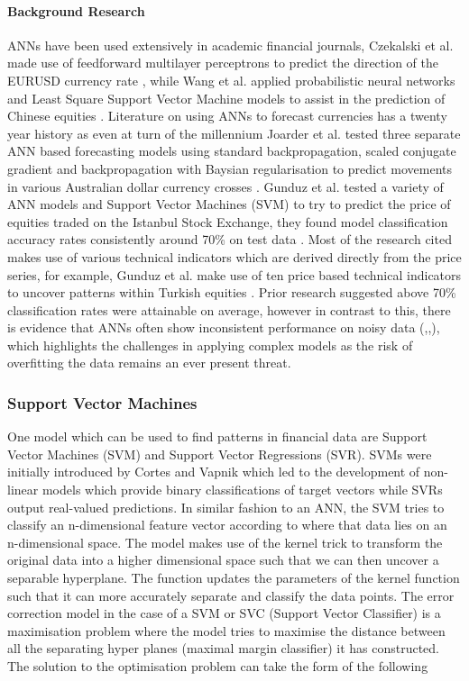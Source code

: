 \documentclass[11pt]{article}
\begin{document}
\paragraph{Background Research}
ANNs have been used extensively in academic financial journals, Czekalski et al. made use of feedforward multilayer perceptrons to predict the direction of the EURUSD currency rate \cite{Czekalski2015}, while Wang et al. applied probabilistic neural networks and  Least Square Support Vector Machine models to assist in the prediction of Chinese equities \cite{Wang2014} . Literature on using ANNs to forecast currencies has a twenty year history as even at turn of the millennium Joarder et al.  tested three separate ANN based forecasting models using standard backpropagation, scaled conjugate gradient and backpropagation with Baysian regularisation to predict movements in various Australian dollar currency crosses \cite{Joarder2003}. Gunduz et al. tested a variety of ANN models and Support Vector Machines (SVM) to try to predict the price of equities traded on the Istanbul Stock Exchange, they found model classification accuracy rates consistently around 70\% on test data \cite{Gunduz2017} . \newline Most of the research cited makes use of various technical indicators which are derived directly from the price series, for example, Gunduz et al. make use of ten price based technical indicators to uncover patterns within Turkish equities \cite{Gunduz2017}. Prior research suggested above 70\% classification rates were attainable on average, however in contrast to this, there is evidence that ANNs often show inconsistent performance on noisy data (\cite{Kim2003},\cite{Kumar2006},\cite{Kim2000}), which highlights the challenges in applying complex models as the risk of overfitting the data remains an ever present threat. 

\subsubsection{Support Vector Machines}
One model which can be used to find patterns in financial data are Support Vector Machines (SVM) and Support Vector Regressions (SVR). SVMs were initially introduced by Cortes and Vapnik \cite{Cortes1995} which led to the development of non-linear models which provide binary classifications of target vectors while SVRs output real-valued predictions. In similar fashion to an ANN, the SVM tries to classify an n-dimensional feature vector according to where that data lies on an n-dimensional space.
\newline The model makes use of the kernel trick \cite{kerneltrick} to transform the original data into a higher dimensional space such that we can then uncover a separable hyperplane. The function updates the parameters of the kernel function such that it can more accurately separate and classify the data points. The error correction model in the case of a SVM or SVC (Support Vector Classifier) is a maximisation problem where the model tries to maximise the distance between all the separating hyper planes (maximal margin classifier) it has constructed.  The solution to the optimisation problem can take the form of the following
\end{document}
